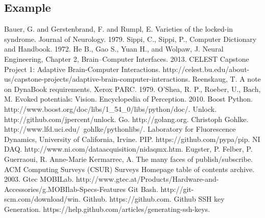 \documentclass[11pt]{article}
\begin{document}
\subsection{Example}

\begin{thebibliography}{99}
  Bauer, G. and Gerstenbrand, F. and Rumpl, E. Varieties of the locked-in syndrome. Journal of Neurology.  1979.
  Sippi, C.,  Sippi, P., Computer Dictionary and Handbook. 1972. 
  He B., Gao S., Yuan H., and Wolpaw, J.  Neural Engineering, Chapter 2, Brain–Computer Interfaces.  2013.
 CELEST Capstone Project 1: Adaptive Brain-Computer Interactions.  http://celest.bu.edu/about-us/capstone-projects/adaptive-brain-computer-interactions.
  Reenskaug, T. A note on DynaBook requirements. Xerox PARC.  1979.
 O’Shea, R. P., Roeber, U., Bach, M. Evoked potentials: Vision.  Encyclopedia of Perception. 2010.
 Boost Python.  http://www.boost.org/doc/libs/1\_54\_0/libs/python/doc/.
 Unlock.  http://github.com/jpercent/unlock.
 Go.  http://golang.org.
  Christoph Gohlke.  http://www.lfd.uci.edu/~gohlke/pythonlibs/.  Laboratory for Fluorescence Dynamics, University of California, Irvine.
 PIP.  https://github.com/pypa/pip.
 NI DAQ.  http://www.ni.com/dataacquisition/nidaqmx.htm.
 Eugster, P.  Felber, P.  Guerraoui, R.  Anne-Marie Kermarrec, A.  The many faces of publish/subscribe.  ACM Computing Surveys (CSUR) Surveys Homepage table of contents archive.  2003.
 Gtec MOBILab.  http://www.gtec.at/Products/Hardware-and-Accessories/g.MOBIlab-Specs-Features
 Git Bash.  http://git-scm.com/download/win.
  Github.  https://github.com.
 Github SSH key Generation.  https://help.github.com/articles/generating-ssh-keys.
\end{thebibliography}
\end{document}

